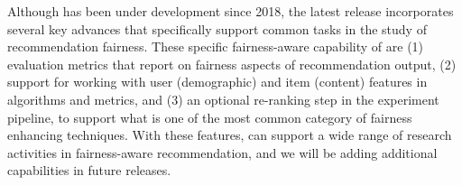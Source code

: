 Although \libauto{} has been under development since 2018, the latest release incorporates several key advances that specifically support common tasks in the study of recommendation fairness. These specific fairness-aware capability of \libauto{} are (1) evaluation metrics that report on fairness aspects of recommendation output, (2) support for working with user (demographic) and item (content) features in algorithms and metrics, and (3) an optional re-ranking step in the experiment pipeline, to support what is one of the most common category of fairness enhancing techniques.
With these features, \libauto{} can support a wide range of research activities in fairness-aware recommendation, and we will be adding additional capabilities in future releases.










